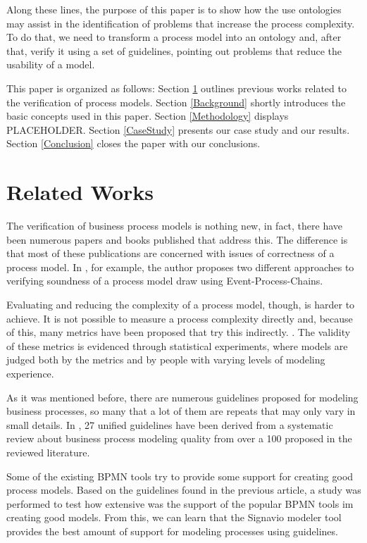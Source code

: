 \documentclass{llncs}
\begin{document}
Along these lines, the purpose of this paper is to show how the use ontologies may assist in the identification of problems that increase the process complexity. To do that, we need to transform a process model into an ontology and, after that, verify it using a set of guidelines, pointing out problems that reduce the usability of a model.


This paper is organized as follows: Section \ref{RelatedWorks} outlines previous works related to the verification of process models. Section \ref{Background} shortly introduces the basic concepts used in this paper. Section \ref{Methodology} displays PLACEHOLDER. Section \ref{CaseStudy} presents our case study and our results. Section \ref{Conclusion} closes the paper with our conclusions.

\section{Related Works}\label{RelatedWorks}


The verification of business process models is nothing new, in fact, there have been numerous papers and books published that address this. The difference is that most of these publications are concerned with issues of correctness of a process model. In \cite{Mendling2008}, for example, the author proposes two different approaches to verifying soundness of a process model draw using Event-Process-Chains.
	
Evaluating and reducing the complexity of a process model, though, is harder to achieve. It is not possible to measure a process complexity directly and, because of this, many metrics have been proposed that try this indirectly. \cite{?}. The validity of these metrics is evidenced through statistical experiments, where models are judged both by the metrics and by people with varying levels of modeling experience.

As it was mentioned before, there are numerous guidelines proposed for modeling business processes, so many that a lot of them are repeats that may only vary in small details. In \cite{Moreno-MontesdeOca2014}, 27 unified guidelines have been derived from a systematic review about business process modeling quality from over a 100 proposed in the reviewed literature. 

Some of the existing BPMN tools try to provide some support for creating good process models. Based on the guidelines found in the previous article, a study \cite{MoniqueSnoeckIsel2015} was performed to test how extensive was the support of the popular BPMN tools im creating good models. From this, we can learn that the Signavio modeler tool provides the best amount of support for modeling processes using guidelines. 
\end{document}
